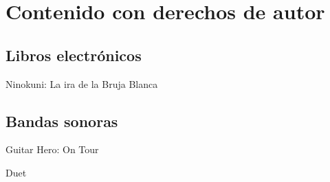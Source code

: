 
\section[Contenido con copyright]{Contenido con derechos de autor}
\subsection{Libros electrónicos}
\begin{frame}{Ninokuni: La ira de la Bruja Blanca}

\end{frame}

\subsection{Bandas sonoras}
\begin{frame}{Guitar Hero: On Tour}

\end{frame}

\begin{frame}{Duet}

\end{frame}
